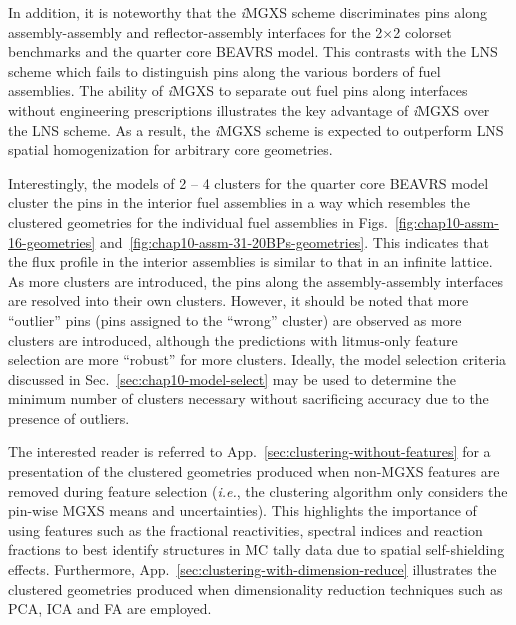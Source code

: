 In addition, it is noteworthy that the \textit{i}\ac{MGXS} scheme discriminates pins along assembly-assembly and reflector-assembly interfaces for the 2$\times$2 colorset benchmarks and the quarter core \ac{BEAVRS} model. This contrasts with the \ac{LNS} scheme which fails to distinguish pins along the various borders of fuel assemblies. The ability of \textit{i}\ac{MGXS} to separate out fuel pins along interfaces without engineering prescriptions illustrates the key advantage of \textit{i}\ac{MGXS} over the \ac{LNS} scheme. As a result, the \textit{i}\ac{MGXS} scheme is expected to outperform \ac{LNS} spatial homogenization for arbitrary core geometries.

Interestingly, the models of 2 -- 4 clusters for the quarter core \ac{BEAVRS} model cluster the pins in the interior fuel assemblies in a way which resembles the clustered geometries for the individual fuel assemblies in Figs.~\ref{fig:chap10-assm-16-geometries} and~\ref{fig:chap10-assm-31-20BPs-geometries}. This indicates that the flux profile in the interior assemblies is similar to that in an infinite lattice. As more clusters are introduced, the pins along the assembly-assembly interfaces are resolved into their own clusters. However, it should be noted that more ``outlier'' pins (pins assigned to the ``wrong'' cluster) are observed as more clusters are introduced, although the predictions with litmus-only feature selection are more ``robust'' for more clusters. Ideally, the model selection criteria discussed in Sec.~\ref{sec:chap10-model-select} may be used to determine the minimum number of clusters necessary without sacrificing accuracy due to the presence of outliers.

The interested reader is referred to App.~\ref{sec:clustering-without-features} for a presentation of the clustered geometries produced when non-\ac{MGXS} features are removed during feature selection (\textit{i.e.}, the clustering algorithm only considers the pin-wise \ac{MGXS} means and uncertainties). This highlights the importance of using features such as the fractional reactivities, spectral indices and reaction fractions to best identify structures in \ac{MC} tally data due to spatial self-shielding effects. Furthermore, App.~\ref{sec:clustering-with-dimension-reduce} illustrates the clustered geometries produced when dimensionality reduction techniques such as PCA, ICA and FA are employed. 


